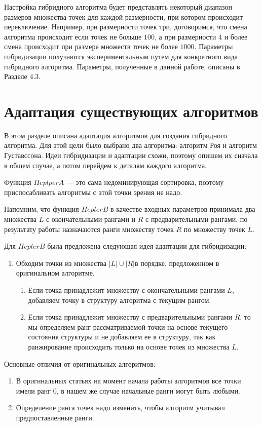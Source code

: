Настройка гибридного алгоритма будет представлять некоторый диапазон размеров множества точек для каждой размерности, при котором происходит переключение. Например, при размерности точек три, договоримся, что смена алгоритма происходит если точек не больше $100$, а при размерности $4$ и более смена происходит при размере множеств точек не более $1000$. Параметры гибридизации получаются экспериментальным путем для конкретного вида гибридного алгоритма. Параметры, полученные в данной работе, описаны в Разделе 4.3.

\section{Адаптация существующих алгоритмов}

В этом разделе описана адаптация алгоритмов для создания гибридного алгоритма. Для этой цели было выбрано два алгоритма: алгоритм Роя и алгоритм Густавссона. Идеи гибридизации и адаптации схожи, поэтому опишем их сначала в общем случае, а потом перейдем к деталям каждого алгоритма. 

Функция $HeplperA$ {---} это сама недоминирующая сортировка, поэтому приспосабливать алгоритмы с этой точки зрения не надо.

Напомним, что функция $HeplerB$ в качестве входных параметров принимала два множества $L$ с окончательными рангами и $R$ с предварительными рангами, по результату работы назначаются ранги множеству точек $R$ по множеству точек $L$. 

Для $HeplerB$ была предложена следующая идея адаптации для гибридизации: 
\begin{enumerate}
  \item Обходим точки из множества $|L| \cup |R|$в порядке, предложенном в оригинальном алгоритме.
  \begin{enumerate}
      \item Если точка принадлежит множеству с окончательными рангами $L$, добавляем точку в структуру алгоритма с текущим рангом.
      \item Если точка принадлежит множеству с предварительными рангами $R$, то мы определяем ранг рассматриваемой точки на основе текущего состояния структуры и не добавляем ее в структуру, так как ранжирование происходить только на основе точек из множества $L$.
  \end{enumerate}
\end{enumerate}

Основные отличия от оригинальных алгоритмов: 
\begin{enumerate}
    \item В оригинальных статьях на момент начала работы алгоритмов все точки имели ранг $0$, в нашем же случае начальные ранги могут быть любыми.
    \item Определение ранга точек надо изменить, чтобы алгоритм учитывал предпоставленные ранги.
\end{enumerate}

